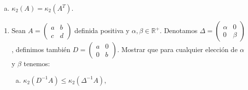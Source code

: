 \documentclass[
	spanish,
	9pt,
	utf8,
	xcolor=table,
	handout,
	aspectratio=1610,
	professionalfonts,
	notheorems,
	mathserif,
]{beamer}
\newcounter{savedenum}
\newcommand*{\saveenum}{\setcounter{savedenum}{\theenumi}}
\newcommand*{\resume}{\setcounter{enumi}{\thesavedenum}}
\begin{document}
\begin{frame}
\begin{enumerate}
		      \begin{enumerate}[a)]
			      \item

			            \begin{math}
				            \kappa_{2}
				            \left(A\right)=
				            \kappa_{2}
				            \left(A^{T}\right)
			            \end{math}.
		      \end{enumerate}

		      \saveenum
	\end{enumerate}
\end{frame}

\begin{frame}
	\begin{enumerate}
		\resume

		\item

		      Sean
		      \begin{math}
			      A=
			      \begin{pmatrix}
				      a & b \\ c & d
			      \end{pmatrix}
		      \end{math}
		      definida positiva y $\alpha,\beta\in\mathbb{R}^{+}$.
		      Denotamos
		      \begin{math}
			      \Delta=
			      \begin{pmatrix}
				      \alpha & 0 \\ 0 & \beta
			      \end{pmatrix}
		      \end{math},
		      definimos también
		      \begin{math}
			      D=
			      \begin{pmatrix}
				      a & 0 \\ 0 & b
			      \end{pmatrix}
		      \end{math}.
		      Mostrar que para cualquier elección de $\alpha$ y $\beta$ tenemos:

		      \begin{multicols}{3}
			      \begin{enumerate}[a)]
				      \item

				            \begin{math}
					            \kappa_{2}
					            \left(D^{-1}A\right)\leq
					            \kappa_{2}
					            \left(\Delta^{-1}A\right)
				            \end{math},


\end{enumerate}
\end{multicols}
\end{enumerate}
\end{frame}
\end{document}
